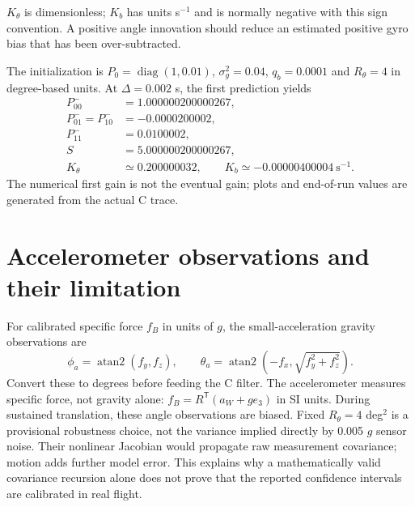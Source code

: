 $K_\theta$ is dimensionless; $K_b$ has units s$^{-1}$ and is normally
negative with this sign convention. A positive angle innovation should
reduce an estimated positive gyro bias that has been over-subtracted.

The initialization is $P_0=\operatorname{diag}(1,0.01)$,
$\sigma_g^2=0.04$, $q_b=0.0001$ and $R_\theta=4$ in degree-based units.
At $\Delta=0.002$ s, the first prediction yields
\begin{align}
P^-_{00}&=1.000000200000267,\\
P^-_{01}=P^-_{10}&=-0.0000200002,\\
P^-_{11}&=0.0100002,\\
S&=5.000000200000267,\\
K_\theta&\simeq0.200000032,\qquad K_b\simeq-0.00000400004\ \mathrm{s}^{-1}.
\end{align}
The numerical first gain is not the eventual gain; plots and end-of-run
values are generated from the actual C trace.

\section{Accelerometer observations and their limitation}
For calibrated specific force $f_B$ in units of $g$, the small-acceleration
gravity observations are
\begin{equation}
\phi_a=\operatorname{atan2}(f_y,f_z),\qquad
\theta_a=\operatorname{atan2}(-f_x,\sqrt{f_y^2+f_z^2}).
\end{equation}
Convert these to degrees before feeding the C filter. The accelerometer
measures specific force, not gravity alone:
$f_B=R^{\mathsf T}(a_W+ge_3)$ in SI units. During sustained translation,
these angle observations are biased. Fixed $R_\theta=4$ deg$^2$ is a
provisional robustness choice, not the variance implied directly by
0.005 $g$ sensor noise. Their nonlinear Jacobian would propagate raw
measurement covariance; motion adds further model error. This explains
why a mathematically valid covariance recursion alone does not prove that
the reported confidence intervals are calibrated in real flight.

